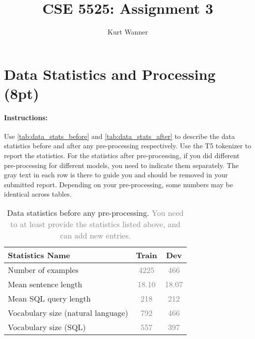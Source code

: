 \documentclass{article}
\title{CSE 5525: Assignment 3}
\author{Kurt Wanner}
\date{}
\begin{document}
\maketitle


\section{Data Statistics and Processing (8pt)}
\paragraph{Instructions:} Use \autoref{tab:data_stats_before} and \autoref{tab:data_stats_after} to describe the data statistics before and after any pre-processing respectively. 
Use the T5 tokenizer to report the statistics. 
For the statistics after pre-processing, if you did different pre-processing for different models, you need to indicate them separately.
The gray text in each row is there to guide you and should be removed in your submitted report.
Depending on your pre-processing, some numbers may be identical across tables. 

\begin{table}[h!]
\centering
\begin{tabular}{lcc}
\toprule
Statistics Name & Train & Dev \\
\midrule
Number of examples & \textcolor{gray}{4225} & \textcolor{gray}{466} \\
Mean sentence length & \textcolor{gray}{18.10}& \textcolor{gray}{18.07} \\
Mean SQL query length & \textcolor{gray}{218}& \textcolor{gray}{212}  \\
Vocabulary size (natural language)& \textcolor{gray}{792}& \textcolor{gray}{466}  \\
Vocabulary size (SQL)& \textcolor{gray}{557}& \textcolor{gray}{397}  \\
\bottomrule
\end{tabular}
\caption{Data statistics before any pre-processing. \textcolor{gray}{You need to at least provide the statistics listed above, and can add new entries.}}
\label{tab:data_stats_before}
\end{table}
\end{document}
